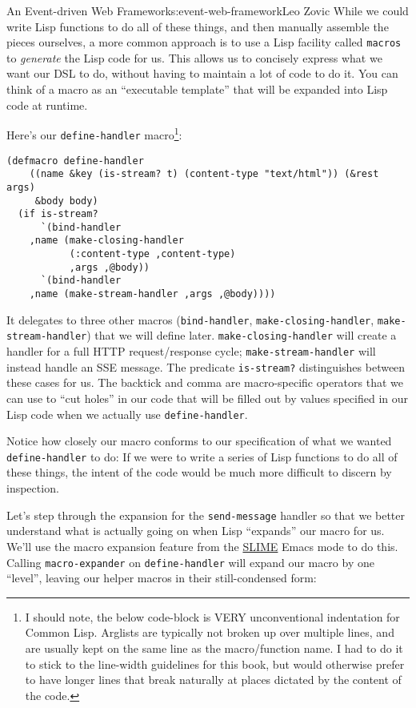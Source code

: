 \begin{aosachapter}{An Event-driven Web Framework}{s:event-web-framework}{Leo Zovic}
While we could write Lisp functions to do all of these things, and then
manually assemble the pieces ourselves, a more common approach is to use
a Lisp facility called \texttt{macros} to \emph{generate} the Lisp code
for us. This allows us to concisely express what we want our DSL to do,
without having to maintain a lot of code to do it. You can think of a
macro as an ``executable template'' that will be expanded into Lisp code
at runtime.

Here's our \texttt{define-handler} macro\footnote{I should note, the
  below code-block is VERY unconventional indentation for Common Lisp.
  Arglists are typically not broken up over multiple lines, and are
  usually kept on the same line as the macro/function name. I had to do
  it to stick to the line-width guidelines for this book, but would
  otherwise prefer to have longer lines that break naturally at places
  dictated by the content of the code.}:

\begin{verbatim}
(defmacro define-handler
    ((name &key (is-stream? t) (content-type "text/html")) (&rest args)
     &body body)
  (if is-stream?
      `(bind-handler
    ,name (make-closing-handler
           (:content-type ,content-type)
           ,args ,@body))
      `(bind-handler
    ,name (make-stream-handler ,args ,@body))))
\end{verbatim}

It delegates to three other macros (\texttt{bind-handler},
\texttt{make-closing-handler}, \texttt{make-stream-handler}) that we
will define later. \texttt{make-closing-handler} will create a handler
for a full HTTP request/response cycle; \texttt{make-stream-handler}
will instead handle an SSE message. The predicate \texttt{is-stream?}
distinguishes between these cases for us. The backtick and comma are
macro-specific operators that we can use to ``cut holes'' in our code
that will be filled out by values specified in our Lisp code when we
actually use \texttt{define-handler}.

Notice how closely our macro conforms to our specification of what we
wanted \texttt{define-handler} to do: If we were to write a series of
Lisp functions to do all of these things, the intent of the code would
be much more difficult to discern by inspection.

\label{expanding-a-handler}

Let's step through the expansion for the \texttt{send-message} handler
so that we better understand what is actually going on when Lisp
``expands'' our macro for us. We'll use the macro expansion feature from
the \href{https://common-lisp.net/project/slime/}{SLIME} Emacs mode to
do this. Calling \texttt{macro-expander} on \texttt{define-handler} will
expand our macro by one ``level'', leaving our helper macros in their
still-condensed form:


\end{aosachapter}

